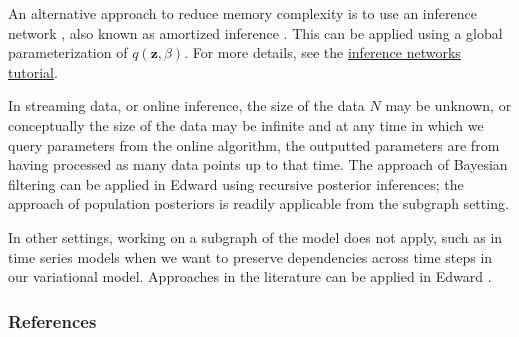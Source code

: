 An alternative approach to reduce memory complexity is to use an
inference network \citep{dayan1995helmholtz}, also known as
amortized inference \citep{stuhlmuller2013learning}.  This can be
applied using a global parameterization of $q(\mathbf{z}, \beta)$. For
more details, see the
\href{/tutorials/inference-networks}{inference networks tutorial}.

In streaming data, or online inference, the size of the data $N$
may be unknown, or conceptually the size of the data may be
infinite and at any time in which we query parameters from the online
algorithm, the outputted parameters are from having processed as many
data points up to that time.
The approach of Bayesian filtering
\citep{doucet2000on,broderick2013streaming} can be applied in Edward using
recursive posterior inferences; the approach of population posteriors
\citep{mcinerney2015population} is readily applicable from the subgraph
setting.

In other settings, working on a subgraph of the model does not
apply, such as in time series models when we want to
preserve dependencies across time steps in our variational model.
Approaches in the literature can be applied in Edward
\citep{binder1997space,johnson2014stochastic,foti2014stochastic}.

\subsubsection{References}\label{references}

